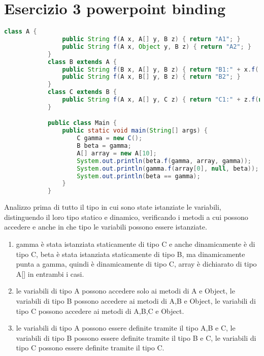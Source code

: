     \section{Esercizio 3 powerpoint binding}
        \begin{lstlisting}[language=java]
            class A {
                public String f(A x, A[] y, B z) { return "A1"; }
                public String f(A x, Object y, B z) { return "A2"; }
            }
            class B extends A {
                public String f(B x, A[] y, B z) { return "B1:" + x.f((A)x, y, z); }
                public String f(A x, B[] y, B z) { return "B2"; }
            }
            class C extends B {
                public String f(A x, A[] y, C z) { return "C1:" + z.f(new C(), y, z); }
            }

            public class Main {
                public static void main(String[] args) {
                    C gamma = new C();
                    B beta = gamma;
                    A[] array = new A[10];
                    System.out.println(beta.f(gamma, array, gamma));
                    System.out.println(gamma.f(array[0], null, beta));
                    System.out.println(beta == gamma);
                }    
            }

        \end{lstlisting}
        Analizzo prima di tutto il tipo in cui sono state istanziate le variabili, distinguendo il loro 
        tipo statico e dinamico, verificando i metodi a cui possono accedere e anche in che tipo le 
        variabili possono essere istanziate.
        \begin{enumerate}
            \item gamma è stata istanziata staticamente di tipo C e anche dinamicamente è di tipo C,
            beta è stata istanziata staticamente di tipo B, ma dinamicamente punta a gamma, quindi 
            è dinamicamente di tipo C, array è dichiarato di tipo A[] in entrambi i casi.
            \item le variabili di tipo A possono accedere solo ai metodi di A e Object, le variabili
            di tipo B possono accedere ai metodi di A,B e Object, le variabili di tipo C possono accedere 
            ai metodi di A,B,C e Object.
            \item le variabili di tipo A possono essere definite tramite il tipo A,B e C, le variabili
            di tipo B possono essere definite tramite il tipo B e C, le variabili di tipo C possono 
            essere definite tramite il tipo C.
        \end{enumerate}

